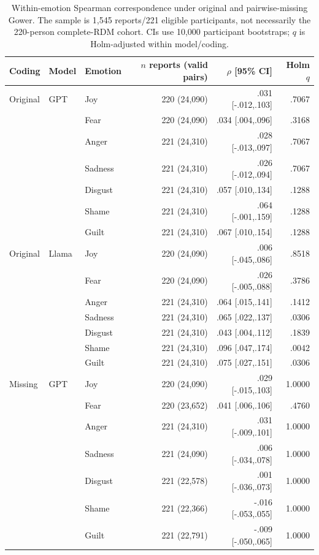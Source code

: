 \begin{table}[t]
\caption{Within-emotion Spearman correspondence under original and pairwise-missing Gower. The sample is 1,545 reports/221 eligible participants, not necessarily the 220-person complete-RDM cohort. CIs use 10,000 participant bootstraps; $q$ is Holm-adjusted within model/coding.}
\label{tab:app-within-emotion}
\centering\scriptsize
\begin{tabular}{lllrrr}
\toprule Coding & Model & Emotion & $n$ reports (valid pairs) & $\rho$ [95\% CI] & Holm $q$ \\
\midrule
Original & GPT & Joy & 220 (24,090) & .031 [-.012,.103] & .7067 \\
 & & Fear & 220 (24,090) & .034 [.004,.096] & .3168 \\
 & & Anger & 221 (24,310) & .028 [-.013,.097] & .7067 \\
 & & Sadness & 221 (24,310) & .026 [-.012,.094] & .7067 \\
 & & Disgust & 221 (24,310) & .057 [.010,.134] & .1288 \\
 & & Shame & 221 (24,310) & .064 [-.001,.159] & .1288 \\
 & & Guilt & 221 (24,310) & .067 [.010,.154] & .1288 \\
Original & Llama & Joy & 220 (24,090) & .006 [-.045,.086] & .8518 \\
 & & Fear & 220 (24,090) & .026 [-.005,.088] & .3786 \\
 & & Anger & 221 (24,310) & .064 [.015,.141] & .1412 \\
 & & Sadness & 221 (24,310) & .065 [.022,.137] & .0306 \\
 & & Disgust & 221 (24,310) & .043 [.004,.112] & .1839 \\
 & & Shame & 221 (24,310) & .096 [.047,.174] & .0042 \\
 & & Guilt & 221 (24,310) & .075 [.027,.151] & .0306 \\
Missing & GPT & Joy & 220 (24,090) & .029 [-.015,.103] & 1.0000 \\
 & & Fear & 220 (23,652) & .041 [.006,.106] & .4760 \\
 & & Anger & 221 (24,310) & .031 [-.009,.101] & 1.0000 \\
 & & Sadness & 221 (24,090) & .006 [-.034,.078] & 1.0000 \\
 & & Disgust & 221 (22,578) & .001 [-.036,.073] & 1.0000 \\
 & & Shame & 221 (22,366) & -.016 [-.053,.055] & 1.0000 \\
 & & Guilt & 221 (22,791) & -.009 [-.050,.065] & 1.0000 \\

\end{tabular}
\end{table}
